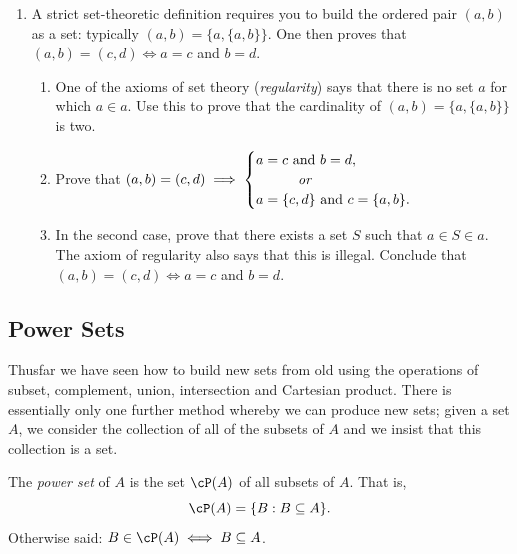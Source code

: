 \begin{enumerate}
	\item A strict set-theoretic definition requires you to build the ordered pair $(a,b)$ as a set: typically $(a,b)=\{a,\{a,b\}\}$. One then proves that $(a,b)=(c,d)\iff a=c$ and $b=d$.
	\begin{enumerate}
	  \item One of the axioms of set theory (\emph{regularity}) says that there is no set $a$ for which $a\in a$. Use this to prove that the cardinality of $(a,b)=\{a,\{a,b\}\}$ is two.
	  \item Prove that $(a,b)=(c,d)\implies\begin{cases}
	  a=c\text{ and }b=d,\\
	  \qquad\quad\text{\emph{or}}\\
	  a=\{c,d\}\text{ and }c=\{a,b\}.
	  \end{cases}$
	  \item In the second case, prove that there exists a set $S$ such that $a\in S\in a$. The axiom of regularity also says that this is illegal. Conclude that $(a,b)=(c,d)\iff a=c$ and $b=d$.
	\end{enumerate}
\end{enumerate}
\newpage

\subsection{Power Sets}

Thusfar we have seen how to build new sets from old using the operations of subset, complement, union, intersection and Cartesian product. There is essentially only one further method whereby we can produce new sets; given a set $A$, we consider the collection of all of the subsets of $A$ and we insist that this collection is a set.

\begin{defn}
The \emph{power set} of $A$ is the set $\cP(A)$ of all subsets of $A$. That is,
\[\cP(A)=\{B:B\subseteq A\}.\]
Otherwise said: $B\in\cP(A)\iff B\subseteq A$.
\end{defn}

